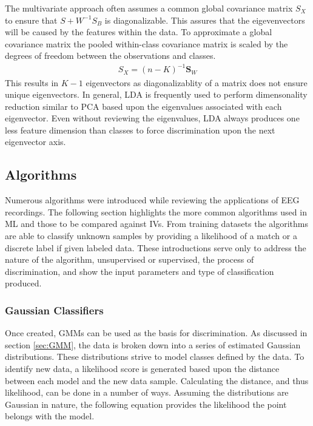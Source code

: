 The multivariate approach often assumes a common global covariance matrix $S_{X}$ to ensure that $S+{W}^{-1}S_{B}$ is diagonalizable. This assures that the eigevenvectors will be caused by the features within the data. To approximate a global covariance matrix the pooled within-class covariance matrix is scaled by the degrees of freedom between the observations and classes.
\begin{gather}
S_{X} = (n-K)^{-1}\bm{S}_{W}
\end{gather} 
This results in $K-1$ eigenvectors as diagonalizablity of a matrix does not ensure unique eigenvectors. In general, \ac{LDA} is frequently used to perform dimensonality reduction similar to \ac{PCA} based upon the eigenvalues associated with each eigenvector. Even without reviewing the eigenvalues, \ac{LDA} always produces one less feature dimension than classes to force discrimination upon the next eigenvector axis.

\subsection{Algorithms}

Numerous algorithms were introduced while reviewing the applications of \ac{EEG} recordings. The following section highlights the more common algorithms used in \ac{ML} and those to be compared against \acp{IV}. From training datasets the algorithms are able to classify unknown samples by providing a likelihood of a match or a discrete label if given labeled data. These introductions serve only to address the nature of the algorithm, unsupervised or supervised, the process of discrimination, and show the input parameters and type of classification produced.

\subsubsection{Gaussian Classifiers}

Once created, \acp{GMM} can be used as the basis for discrimination. As discussed in section \ref{sec:GMM}, the data is broken down into a series of estimated Gaussian distributions. These distributions strive to model classes defined by the data. To identify new data, a likelihood score is generated based upon the distance between each model and the new data sample. Calculating the distance, and thus likelihood, can be done in a number of ways. Assuming the distributions are Gaussian in nature, the following equation provides the likelihood the point belongs with the model.

